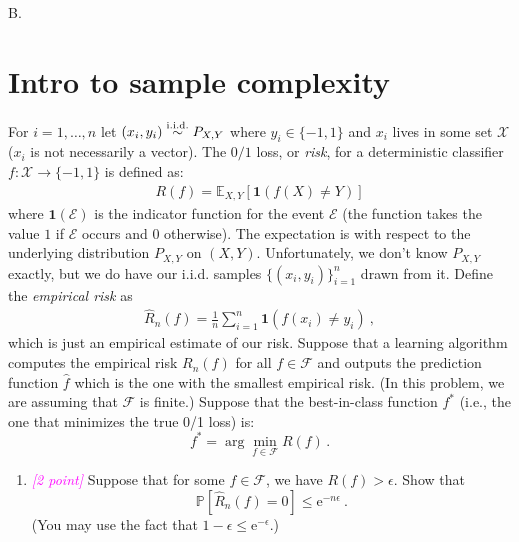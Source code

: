\documentclass{article}
\newcommand{\1}{\mathbf{1}}
\renewcommand{\P}{\mathbb{P}}
\providecommand*{\eu}{\ensuremath{\mathrm{e}}}
\newcommand{\points}[1]{\small\textcolor{magenta}{\emph{[#1 point\ifthenelse{\equal{#1}{1}}{}{s}]}} \normalsize}
\newcounter{bprob}
\newenvironment{bprob}[1][]{\begin{mdframed} \refstepcounter{bprob}\par\medskip
  B\thebprob.#1 }
   { \end{mdframed} }
\begin{document}
\newpage

\begin{bprob}
\section*{Intro to sample complexity}
For $i=1,\dots,n$ let $(x_i,y_i) \overset{\rm i.i.d.}{\sim} P_{X,Y}$ where $y_i \in \{-1,1\}$ and $x_i$ lives in some set $\mathcal{X}$ ($x_i$ is not necessarily a vector).
The $0/1$ loss, or \emph{risk}, for a deterministic classifier $f\colon \mathcal{X} \rightarrow \{ -1,1 \}$ is defined as:
\begin{align*}
R(f) = \mathbb E_{X,Y} [\1(f(X)\neq Y)]
\end{align*}
where $\1(\mathcal{E})$ is the indicator function for the event $\mathcal{E}$ (the
function takes the value $1$ if $\mathcal{E}$ occurs and $0$ otherwise).
The expectation is with respect to the underlying distribution $P_{X,Y}$ on $(X,Y)$.
Unfortunately, we don't know $P_{X,Y}$ exactly, but we do have our i.i.d. samples $\{(x_i,y_i)\}_{i=1}^n$ drawn from it.
Define the \emph{empirical risk} as 
\begin{align*}
\widehat R_n(f) = \frac{1}{n} \sum_{i=1}^n \mathbf{1}(f(x_i)\neq y_i)\ ,
\end{align*}
which is just an empirical estimate of our risk.
Suppose that a learning algorithm computes the empirical risk $R_n(f)$ for all $f \in \mathcal{F}$ and outputs the prediction function $\widehat f$ which is the one with the smallest empirical risk.  (In this problem, we are assuming that  $\mathcal{F}$ is finite.) Suppose that the best-in-class function  $f^*$ (i.e., the one that minimizes the true 0/1 loss)
 is:
\[
  f^* = \arg\min_{f \in \mathcal{F}} R(f) \, . 
\]
\begin{enumerate}
\item \points{2} Suppose that for some $f \in \mathcal{F}$, we have $R(f) > \epsilon$. 
Show that
\[
    \P\left[ \widehat{R}_n(f) = 0 \right] \leq \eu^{-n \epsilon}\ .
\]
(You may use the fact that $1-\epsilon \le \eu^{-\epsilon}$.)


\end{enumerate}
\end{bprob}
\end{document}

